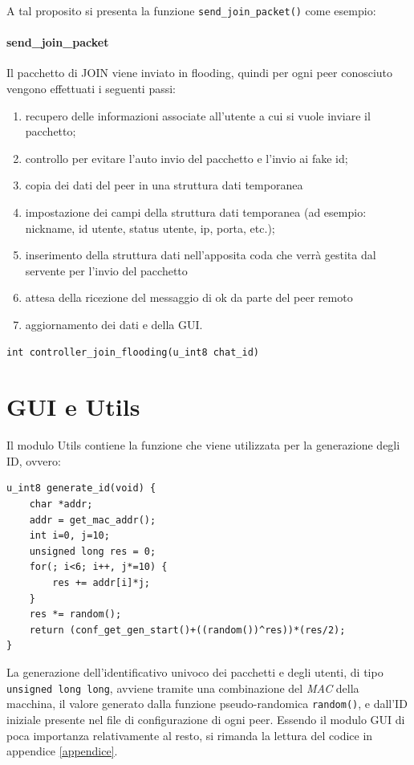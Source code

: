 A tal proposito si presenta la funzione \texttt{send\_join\_packet()} come esempio:
\paragraph{send\_join\_packet}
Il pacchetto di JOIN viene inviato in flooding, quindi per ogni peer conosciuto vengono effettuati i seguenti passi:
\begin{enumerate}
\item recupero delle informazioni associate all'utente a cui si vuole inviare il pacchetto;
\item controllo per evitare l'auto invio del pacchetto e l'invio ai fake id;
\item copia dei dati del peer in una struttura dati temporanea
\item impostazione dei campi della struttura dati temporanea (ad esempio: nickname, id utente, status utente, ip, porta, etc.);
\item inserimento della struttura dati nell'apposita coda che verrà gestita dal servente per l'invio del pacchetto
\item attesa della ricezione del messaggio di ok da parte del peer remoto
\item aggiornamento dei dati e della GUI.
\end{enumerate}
\begin{lstlisting}
int controller_join_flooding(u_int8 chat_id)
\end{lstlisting}
\section{GUI e Utils}
Il modulo Utils contiene la funzione che viene utilizzata per la generazione degli ID, ovvero:
\begin{lstlisting}[]
u_int8 generate_id(void) {
	char *addr;
	addr = get_mac_addr();
	int i=0, j=10;
	unsigned long res = 0;
	for(; i<6; i++, j*=10) {
		res += addr[i]*j;
	}
	res *= random();
	return (conf_get_gen_start()+((random())^res))*(res/2);
}
\end{lstlisting}
La generazione dell'identificativo univoco dei pacchetti e degli utenti, di tipo \texttt{unsigned long long}, avviene tramite una combinazione del \textit{MAC} della macchina, il valore generato dalla funzione pseudo-randomica \texttt{random()}, e dall'ID iniziale presente nel file di configurazione di ogni peer.
Essendo il modulo GUI di poca importanza relativamente al resto, si rimanda la lettura del codice in appendice \ref{appendice}.